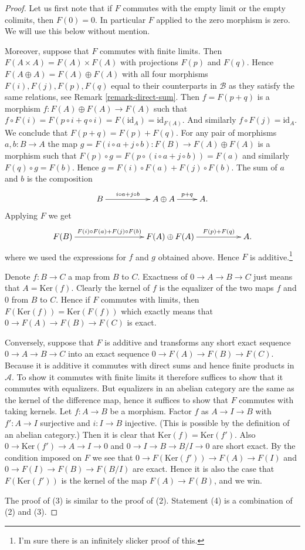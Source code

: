 \begin{proof}
Let us first note that if $F$ commutes with the empty limit or
the empty colimits, then $F(0) = 0$. In particular $F$ applied
to the zero morphism is zero. We will use this below without mention.

\medskip\noindent
Moreover, suppose that $F$ commutes with finite limits.
Then $F(A \times A) = F(A) \times F(A)$ with
projections $F(p)$ and $F(q)$. Hence
$F(A \oplus A) = F(A) \oplus F(A)$ with all
four morphisms $F(i), F(j), F(p), F(q)$ equal to their
counterparts in $\mathcal{B}$ as they satisfy the same
relations, see Remark \ref{remark-direct-sum}.
Then $f = F(p + q)$ is a morphism $f : F(A) \oplus F(A) \to F(A)$
such that $f \circ F(i) = F(p \circ i + q \circ i) = F(\text{id}_A)
= \text{id}_{F(A)}$. And similarly $f \circ F(j) = \text{id}_A$.
We conclude that $F(p + q) = F(p) + F(q)$. For
any pair of morphisms $a, b : B \to A$ the map
$g = F(i \circ a + j \circ b) : F(B) \to F(A) \oplus F(A)$
is a morphism such that $F(p) \circ g =
F(p \circ (i \circ a + j \circ b)) = F(a)$ and similarly
$F(q) \circ g = F(b)$. Hence $g = F(i) \circ F(a) + F(j) \circ F(b)$.
The sum of $a$ and $b$ is the composition
$$
\xymatrix{
B \ar[rr]^-{i \circ a + j \circ b} & &
A \oplus A \ar[r]^-{p + q} & A.
}
$$
Applying $F$ we get
$$
\xymatrix{
F(B) \ar[rrr]^-{F(i) \circ F(a) + F(j) \circ F(b)} & & &
F(A) \oplus F(A) \ar[rr]^-{F(p) + F(q)} & &
A.
}
$$
where we used the expressions for $f$ and $g$ obtained above.
Hence $F$ is additive.\footnote{I'm sure there is an infinitely
slicker proof of this.}

\medskip\noindent
Denote $f : B \to C$ a map from $B$ to $C$.
Exactness of $0 \to A \to B \to C$ just means that
$A = \text{Ker}(f)$. Clearly the kernel of $f$ is
the equalizer of the two maps $f$ and $0$ from $B$ to $C$.
Hence if $F$ commutes with limits, then $F(\text{Ker}(f))
= \text{Ker}(F(f))$ which exactly means that
$0 \to F(A) \to F(B) \to F(C)$ is exact.

\medskip\noindent
Conversely, suppose that $F$ is additive and
transforms any short exact sequence $0 \to A \to B \to C$ into
an exact sequence $0 \to F(A) \to F(B) \to F(C)$.
Because it is additive it commutes with direct sums
and hence finite products in $\mathcal{A}$. To show
it commutes with finite limits it therefore
suffices to show that it commutes with
equalizers. But equalizers in an abelian category
are the same as the kernel of the difference map,
hence it suffices to show that $F$ commutes with
taking kernels. Let $f : A \to B$ be a morphism.
Factor $f$ as $A \to I \to B$ with $f' : A \to I$ surjective
and $i : I \to B$ injective. (This is possible by the
definition of an abelian category.) Then it is
clear that $\text{Ker}(f) = \text{Ker}(f')$. Also
$0 \to \text{Ker}(f') \to A \to I \to 0$
and
$0 \to I \to B \to B/I \to 0$
are short exact. By the condition imposed on $F$
we see that
$0 \to F(\text{Ker}(f')) \to F(A) \to F(I)$
and
$0 \to F(I) \to F(B) \to F(B/I)$
are exact. Hence it is also the case that
$F(\text{Ker}(f'))$ is the kernel of the map
$F(A) \to F(B)$, and we win.

\medskip\noindent
The proof of (3) is similar to the proof of (2).
Statement (4) is a combination of (2) and (3).
\end{proof}

